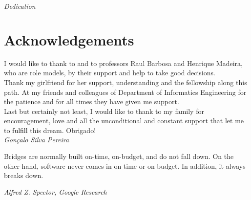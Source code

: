 
\pagestyle{empty}
\begin{center}

\emph{Dedication}

\end{center}

\clearpage
\section*{Acknowledgements}

I would like to thank to \red{---------} and to professors Raul Barbosa and Henrique Madeira, who are role models, by their support and help to take good decisions.\\

Thank my girlfriend for her support, understanding and the fellowship along this path. At my friends and colleagues of Department of Informatics Engineering for the patience and for all times they have given me support. \\

Last but certainly not least, I would like to thank to my family for encouragement, love and all the unconditional and constant support that let me to fulfill this dream. Obrigado!\\



\emph{\hfill Gonçalo Silva Pereira}

\clearpage

\vspace*{\fill}
\pagestyle{empty}

\begin{shadequote}
Bridges are normally built on-time, on-budget, and do not
fall down. On the other hand, software never comes in on-time
or on-budget. In addition, it always breaks down.\par\emph{Alfred Z. Spector, Google Research}
\end{shadequote}

